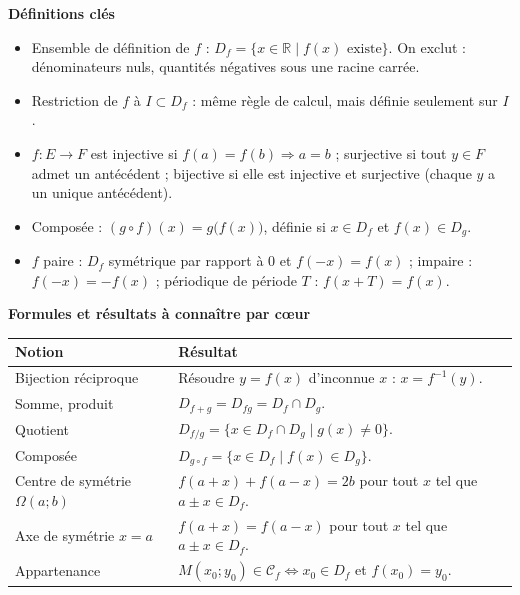 \documentclass[11pt]{article}
\newcommand{\cle}[1]{{\popxbold\color{popdark}#1}}
\begin{document}
\begin{bilan}
\textbf{Définitions clés}
\begin{itemize}
  \item \cle{Ensemble de définition} de $f$ : $D_f=\{x\in\mathbb{R}\mid f(x)\text{ existe}\}$. On exclut : dénominateurs nuls, quantités négatives sous une racine carrée.
  \item \cle{Restriction} de $f$ à $I\subset D_f$ : même règle de calcul, mais définie seulement sur $I$.
  \item $f:E\to F$ est \cle{injective} si $f(a)=f(b)\Rightarrow a=b$ ; \cle{surjective} si tout $y\in F$ admet un antécédent ; \cle{bijective} si elle est injective et surjective (chaque $y$ a un unique antécédent).
  \item \cle{Composée} : $(g\circ f)(x)=g\bigl(f(x)\bigr)$, définie si $x\in D_f$ et $f(x)\in D_g$.
  \item $f$ \cle{paire} : $D_f$ symétrique par rapport à $0$ et $f(-x)=f(x)$ ; \cle{impaire} : $f(-x)=-f(x)$ ; \cle{périodique} de période $T$ : $f(x+T)=f(x)$.
\end{itemize}

\textbf{Formules et résultats à connaître par cœur}
\begin{center}
\begin{tabularx}{\linewidth}{|l|X|}\hline
\rowcolor{popblueL} \textbf{Notion} & \textbf{Résultat} \\ \hline
Bijection réciproque & Résoudre $y=f(x)$ d'inconnue $x$ : $x=f^{-1}(y)$. \\ \hline
Somme, produit & $D_{f+g}=D_{fg}=D_f\cap D_g$. \\ \hline
Quotient & $D_{f/g}=\{x\in D_f\cap D_g\mid g(x)\neq 0\}$. \\ \hline
Composée & $D_{g\circ f}=\{x\in D_f\mid f(x)\in D_g\}$. \\ \hline
Centre de symétrie $\Omega(a;b)$ & $f(a+x)+f(a-x)=2b$ pour tout $x$ tel que $a\pm x\in D_f$. \\ \hline
Axe de symétrie $x=a$ & $f(a+x)=f(a-x)$ pour tout $x$ tel que $a\pm x\in D_f$. \\ \hline
Appartenance & $M(x_0;y_0)\in\mathcal{C}_f \iff x_0\in D_f$ et $f(x_0)=y_0$. \\ \hline
\end{tabularx}
\end{center}


\end{bilan}
\end{document}
